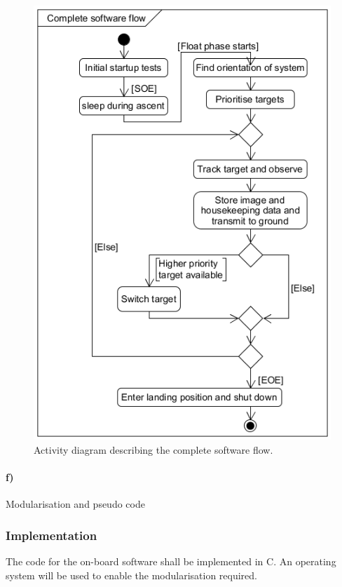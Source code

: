 \begin{figure}[H] %
    \centering
    \includegraphics[width=.5\textwidth]{4-experiment-design/img/software/activity-diagram.png}
    \caption{Activity diagram describing the complete software flow.}
    \label{fig:4-8-2-activity-diagram}
\end{figure}


\paragraph{f)} Modularisation and pseudo code\\


\subsubsection{Implementation}\label{sec:4.8.3}

The code for the on-board software shall be implemented in C. An operating system will be used to enable the modularisation required.

\raggedbottom
